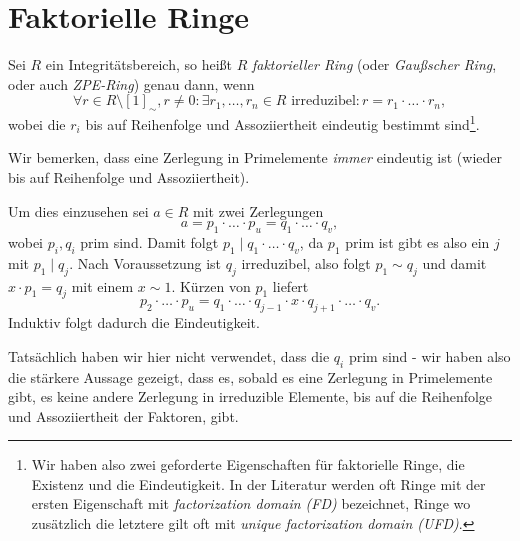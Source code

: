 
\section{Faktorielle Ringe}

\begin{definition}
    Sei $R$ ein Integritätsbereich, so heißt $R$ \emph{faktorieller Ring} (oder \emph{Gaußscher Ring}, oder auch \emph{ZPE-Ring}) genau dann, wenn
    $$ \forall r \in R\setminus [1]_\sim, r\neq 0: \exists r_1, \hdots, r_n \in R\text{ irreduzibel} : r = r_1 \cdot \hdots \cdot r_n, $$
    wobei die $r_i$ bis auf Reihenfolge und Assoziiertheit eindeutig bestimmt sind\footnote{Wir haben also zwei geforderte Eigenschaften für faktorielle Ringe, die Existenz und die Eindeutigkeit. In der Literatur werden oft Ringe mit der ersten Eigenschaft mit \emph{factorization domain (FD)} bezeichnet, Ringe wo zusätzlich die letztere gilt oft mit \emph{unique factorization domain (UFD)}.}.
\end{definition}

\begin{remark} \label{remark:prim-eindeutig}
    Wir bemerken, dass eine Zerlegung in Primelemente \emph{immer} eindeutig ist (wieder bis auf Reihenfolge und Assoziiertheit).

    Um dies einzusehen sei $a \in R$ mit zwei Zerlegungen
    $$ a = p_1 \cdot \hdots \cdot p_u = q_1 \cdot \hdots \cdot q_v, $$
    wobei $p_i, q_i$ prim sind. Damit folgt $p_1 \mid q_1 \cdot \hdots \cdot q_v$, da $p_1$ prim ist gibt es also ein $j$ mit $p_1 \mid q_j$. Nach Voraussetzung ist $q_j$ irreduzibel, also folgt $p_1 \sim q_j$ und damit $x \cdot p_1 = q_j$ mit einem $x \sim 1$. Kürzen von $p_1$ liefert
    $$ p_2 \cdot \hdots \cdot p_u = q_1 \cdot \hdots \cdot q_{j-1} \cdot x \cdot q_{j+1} \cdot \hdots \cdot q_v. $$
    Induktiv folgt dadurch die Eindeutigkeit.

    Tatsächlich haben wir hier nicht verwendet, dass die $q_i$ prim sind - wir haben also die stärkere Aussage gezeigt, dass es, sobald es eine Zerlegung in Primelemente gibt, es keine andere Zerlegung in irreduzible Elemente, bis auf die Reihenfolge und Assoziiertheit der Faktoren, gibt.
\end{remark}

